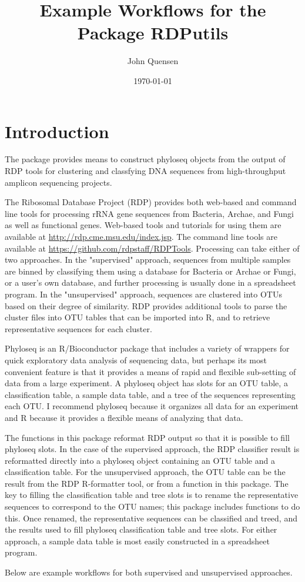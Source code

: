 \documentclass{article}
\title{Example Workflows for the Package RDPutils}
\author{John Quensen}
\date{\today}
\begin{document}

\maketitle

\section*{Introduction}
The package provides means to construct phyloseq objects from the output of RDP tools for clustering and classfying DNA sequences from high-throughput amplicon sequencing projects.

The Ribosomal Database Project (RDP) provides both web-based and command line tools for processing rRNA gene sequences from Bacteria, Archae, and Fungi as well as functional genes.  Web-based tools and tutorials for using them are available at \href{http://rdp.cme.msu.edu/index.jsp}{http://rdp.cme.msu.edu/index.jsp}.  The command line tools are available at \href{https://github.com/rdpstaff/RDPTools}{https://github.com/rdpstaff/RDPTools}. Processing can take either of two approaches.  In the "supervised" approach, sequences from multiple samples are binned by classifying them using a database for Bacteria or Archae or Fungi, or a user's own database, and further processing is usually done in a spreadsheet program.  In the "unsupervised" approach, sequences are clustered into OTUs based on their degree of similarity.   RDP provides additional tools to parse the cluster files into OTU tables that can be imported into R, and to retrieve representative sequences for each cluster.  

Phyloseq is an R/Bioconductor package that includes a variety of wrappers for quick exploratory data analysis of sequencing data, but perhaps its most convenient feature is that it provides a means of rapid and flexible sub-setting of data from a large experiment.  A phyloseq object has slots for an OTU table, a classification table, a sample data table, and a tree of the sequences representing each OTU.  I recommend phyloseq because it organizes all data for an experiment and R because it provides a flexible means of analyzing that data.

The functions in this package reformat RDP output so that it is possible to fill phyloseq slots.  In the case of the supervised approach, the RDP classifier result is reformatted directly into a phyloseq object containing an OTU table and a classification table.  For the unsupervised approach, the OTU table can be the result from the RDP R-formatter tool, or from a function in this package. The key to filling the classification table and tree slots is to rename the representative sequences to correspond to the OTU names; this package includes functions to do this.  Once renamed, the representative sequences can be classified and treed, and the results used to fill phyloseq classification table and tree slots.  For either approach, a sample data table is most easily constructed in a spreadsheet program.

Below are example workflows for both supervised and unsupervised approaches.
\end{document}

